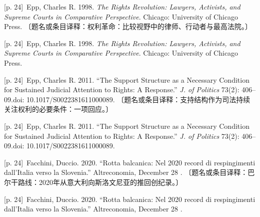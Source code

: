 \documentclass[10pt,a4paper]{article}
\begin{document}
\noindent\begin{minipage}{\textwidth}\begin{minipage}[t]{\dimexpr.5\textwidth-4mm\relax}{\scriptsize\color{gray} [p. 24]}\ Epp, Charles R. 1998. \textit{The Rights Revolution: Lawyers, Activists, and Supreme Courts in Comparative Perspective}. Chicago: University of Chicago Press. 〔题名或条目译释：权利革命：比较视野中的律师、行动者与最高法院。〕\par\end{minipage}\hfill\begin{minipage}[t]{\dimexpr.5\textwidth-4mm\relax}{\scriptsize\color{gray} [p. 24]}\ Epp, Charles R. 1998. \textit{The Rights Revolution: Lawyers, Activists, and Supreme Courts in Comparative Perspective}. Chicago: University of Chicago Press.\par\end{minipage}\end{minipage}\par
\noindent\begin{minipage}{\textwidth}\begin{minipage}[t]{\dimexpr.5\textwidth-4mm\relax}{\scriptsize\color{gray} [p. 24]}\ Epp, Charles R. 2011. “The Support Structure as a Necessary Condition for Sustained Judicial Attention to Rights: A Response.” \textit{J. of Politics} 73(2): 406–09.doi: 10.1017/S0022381611000089. 〔题名或条目译释：支持结构作为司法持续关注权利的必要条件：一项回应。〕\par\end{minipage}\hfill\begin{minipage}[t]{\dimexpr.5\textwidth-4mm\relax}{\scriptsize\color{gray} [p. 24]}\ Epp, Charles R. 2011. “The Support Structure as a Necessary Condition for Sustained Judicial Attention to Rights: A Response.” \textit{J. of Politics} 73(2): 406–09.doi: 10.1017/S0022381611000089.\par\end{minipage}\end{minipage}\par
\noindent\begin{minipage}{\textwidth}\begin{minipage}[t]{\dimexpr.5\textwidth-4mm\relax}{\scriptsize\color{gray} [p. 24]}\ Facchini, Duccio. 2020. “Rotta balcanica: Nel 2020 record di respingimenti dall’Italia verso la Slovenia.” Altreconomia, December 28 . 〔题名或条目译释：巴尔干路线：2020年从意大利向斯洛文尼亚的推回创纪录。〕\par\end{minipage}\hfill\begin{minipage}[t]{\dimexpr.5\textwidth-4mm\relax}{\scriptsize\color{gray} [p. 24]}\ Facchini, Duccio. 2020. “Rotta balcanica: Nel 2020 record di respingimenti dall’Italia verso la Slovenia.” Altreconomia, December 28 .\par\end{minipage}\end{minipage}\par
\end{document}
